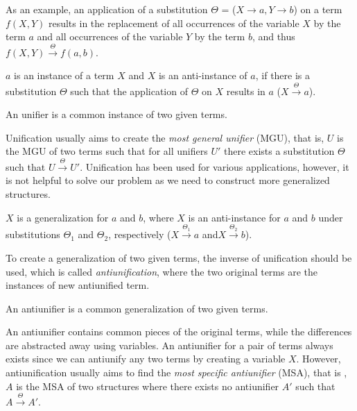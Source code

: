 As an example, an application of a substitution $\Theta$ = ({$X \rightarrow a, Y \rightarrow b $})
on a term $f(X,Y)$ results in the replacement of all occurrences of the variable $X$ by the term $a$ and all occurrences of the variable $Y$ by the term $b$, and thus $f(X,Y)\xrightarrow{\Theta} f(a,b)$.



\begin{defn}\label{def:instance}
 $a$ is an instance of a term $X$ and $X$ is an anti-instance of $a$, if there is a substitution $\Theta$ such that the application of $\Theta$ on $X$ results in $a$ ($X\xrightarrow{\Theta}a$).
\end{defn}

\begin{defn}[Unifier]\label{def:unifier}
An unifier is a common instance of two given terms.
\end{defn}

Unification usually aims to create the \emph{most general unifier} (MGU), that is, $U$ is the MGU of two terms such that for all unifiers $U'$ there exists a substitution $\Theta$ such that $U\xrightarrow{\Theta}U'$. Unification has been used for various applications, however, it is not helpful to solve our problem as we need to construct more generalized structures. 

\begin{defn}[Generalization]\label{def:generalization}
$X$ is a generalization for $a$ and $b$, where $X$ is an anti-instance for $a$ and $b$ under substitutions $\Theta_1$ and $\Theta_2$, respectively ($X\xrightarrow{\Theta_1}a$ and$X\xrightarrow{\Theta_2}b$).
\end{defn}
To create a generalization of two given terms, the inverse of unification should be used, which is called \emph{antiunification}, where the two original terms are the instances of new antiunified term.

\begin{defn}[antiunifier]\label{def:antiunifier}
An antiunifier is a common generalization of two given terms.
\end{defn}

An antiunifier contains common pieces of the original terms, while the differences are abstracted away using variables. An antiunifier for a pair of terms always exists since we can antiunify any two terms by creating a variable $X$. However, antiunification usually aims to find the \emph{most specific antiunifier} (MSA), that is , $A$ is the MSA of two structures where there exists no antiunifier $A'$ such that $A\xrightarrow{\Theta}A'$.

